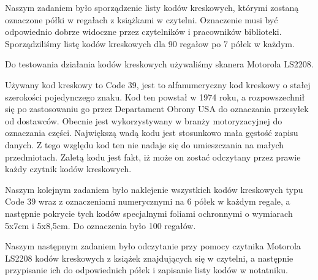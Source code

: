 Naszym zadaniem było sporządzenie listy kodów kreskowych, którymi zostaną oznaczone półki w regałach z książkami w czytelni. Oznaczenie musi być odpowiednio dobrze widoczne  przez czytelników i pracowników biblioteki. 
Sporządziliśmy listę kodów kreskowych dla 90 regałow po 7 półek w każdym.

Do testowania działania kodów kreskowych używaliśmy skanera Motorola LS2208.


Używany kod kreskowy to Code 39, jest to  alfanumeryczny kod kreskowy o stałej szerokości pojedynczego znaku. Kod ten powstał w 1974 roku, a rozpowszechnił się po zastosowaniu go przez Departament Obrony USA do oznaczania przesyłek od dostawców. Obecnie jest wykorzystywany w branży motoryzacyjnej do oznaczania części. Największą wadą kodu jest stosunkowo mała gęstość zapisu danych. Z tego względu kod ten nie nadaje się do umieszczania na małych przedmiotach. Zaletą kodu jest fakt, iż może on zostać odczytany przez prawie każdy czytnik kodów kreskowych.


Naszym kolejnym zadaniem było naklejenie wszystkich kodów kreskowych typu Code 39 wraz z oznaczeniami numerycznymi na 6 półek w każdym regale, a następnie pokrycie tych kodów  specjalnymi foliami ochronnymi o wymiarach 5x7cm i 5x8,5cm. Do oznaczenia było 100 regałów.


Naszym następnym zadaniem było odczytanie przy pomocy czytnika Motorola LS2208 kodów kreskowych z książek znajdujących się w czytelni, a następnie przypisanie ich do odpowiednich półek i zapisanie listy kodów w notatniku.